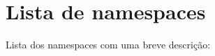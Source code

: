 \section{Lista de namespaces}
Lista dos namespaces com uma breve descrição\+:\begin{DoxyCompactList}
\item{}
\item{}
\item{}
\end{DoxyCompactList}
